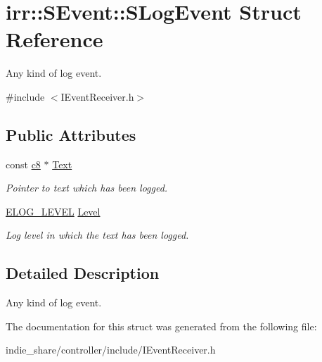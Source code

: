\hypertarget{structirr_1_1SEvent_1_1SLogEvent}{}\section{irr\+:\+:S\+Event\+:\+:S\+Log\+Event Struct Reference}
\label{structirr_1_1SEvent_1_1SLogEvent}


Any kind of log event.  




{\ttfamily \#include $<$I\+Event\+Receiver.\+h$>$}

\subsection*{Public Attributes}
\begin{DoxyCompactItemize}
\item 
\mbox{\label{structirr_1_1SEvent_1_1SLogEvent_a3d72b313f182460ef08fa122ff673944}} 
const \hyperlink{namespaceirr_a9395eaea339bcb546b319e9c96bf7410}{c8} $\ast$ \hyperlink{structirr_1_1SEvent_1_1SLogEvent_a3d72b313f182460ef08fa122ff673944}{Text}
\begin{DoxyCompactList}\small\item\em Pointer to text which has been logged. \end{DoxyCompactList}\item 
\mbox{\label{structirr_1_1SEvent_1_1SLogEvent_aeb9088d42b7445ac43558e4fe5319db6}} 
\hyperlink{namespaceirr_aa2d1cac68606a25ed24cfffccfa30a92}{E\+L\+O\+G\+\_\+\+L\+E\+V\+EL} \hyperlink{structirr_1_1SEvent_1_1SLogEvent_aeb9088d42b7445ac43558e4fe5319db6}{Level}
\begin{DoxyCompactList}\small\item\em Log level in which the text has been logged. \end{DoxyCompactList}\end{DoxyCompactItemize}


\subsection{Detailed Description}
Any kind of log event. 

The documentation for this struct was generated from the following file\+:\begin{DoxyCompactItemize}
\item 
indie\+\_\+share/controller/include/I\+Event\+Receiver.\+h\end{DoxyCompactItemize}
